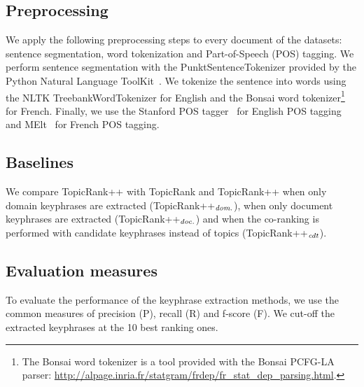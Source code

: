   \subsection{Preprocessing}
  \label{subsec:preprocessing}
    We apply the following preprocessing steps to every document of the
    datasets: sentence segmentation, word tokenization and Part-of-Speech (POS)
    tagging. We perform sentence segmentation with the PunktSentenceTokenizer
    provided by the Python Natural Language ToolKit~\cite[NLTK]{bird2009nltk}.
    We tokenize the sentence into words using the NLTK TreebankWordTokenizer for
    English and the Bonsai word tokenizer\footnote{The Bonsai word tokenizer is
    a tool provided with the Bonsai PCFG-LA parser:
    \url{http://alpage.inria.fr/statgram/frdep/fr_stat_dep_parsing.html}.} for
    French. Finally, we use the Stanford POS
    tagger~\cite{toutanova2003stanfordpostagger} for English POS tagging and
    MElt~\cite{denis2009melt} for French POS tagging.

  \subsection{Baselines}
  \label{subsec:baselines}
    We compare TopicRank++ with TopicRank and TopicRank++ when only domain
    keyphrases are extracted (TopicRank++$_\textnormal{\textit{dom.}}$), when
    only document keyphrases are extracted
    (TopicRank++$_\textnormal{\textit{doc.}}$) and when the co-ranking is
    performed with candidate keyphrases instead of topics
    (TopicRank++$_\textnormal{\textit{cdt}}$).

  \subsection{Evaluation measures}
  \label{subsec:evaluation_measures}
    To evaluate the performance of the keyphrase extraction methods, we use the
    common measures of precision (P), recall (R) and f-score (F). We cut-off the
    extracted keyphrases at the 10 best ranking ones.

